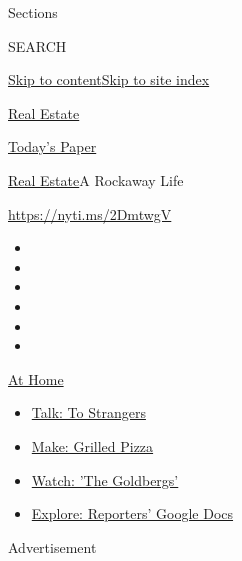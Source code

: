 Sections

SEARCH

\protect\hyperlink{site-content}{Skip to
content}\protect\hyperlink{site-index}{Skip to site index}

\href{https://www.nytimes.com/section/realestate}{Real Estate}

\href{https://myaccount.nytimes.com/auth/login?response_type=cookie\&client_id=vi}{}

\href{https://www.nytimes.com/section/todayspaper}{Today's Paper}

\href{/section/realestate}{Real Estate}\textbar{}A Rockaway Life

\url{https://nyti.ms/2DmtwgV}

\begin{itemize}
\item
\item
\item
\item
\item
\item
\end{itemize}

\href{https://www.nytimes.com/spotlight/at-home?action=click\&pgtype=Article\&state=default\&region=TOP_BANNER\&context=at_home_menu}{At
Home}

\begin{itemize}
\tightlist
\item
  \href{https://www.nytimes.com/2020/08/03/well/family/the-benefits-of-talking-to-strangers.html?action=click\&pgtype=Article\&state=default\&region=TOP_BANNER\&context=at_home_menu}{Talk:
  To Strangers}
\item
  \href{https://www.nytimes.com/2020/08/01/at-home/coronavirus-make-pizza-on-a-grill.html?action=click\&pgtype=Article\&state=default\&region=TOP_BANNER\&context=at_home_menu}{Make:
  Grilled Pizza}
\item
  \href{https://www.nytimes.com/2020/07/31/arts/television/goldbergs-abc-stream.html?action=click\&pgtype=Article\&state=default\&region=TOP_BANNER\&context=at_home_menu}{Watch:
  'The Goldbergs'}
\item
  \href{https://www.nytimes.com/interactive/2020/at-home/even-more-reporters-editors-diaries-lists-recommendations.html?action=click\&pgtype=Article\&state=default\&region=TOP_BANNER\&context=at_home_menu}{Explore:
  Reporters' Google Docs}
\end{itemize}

Advertisement

